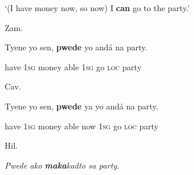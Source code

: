 \setcounter{listWWNumiileveli}{0}
\begin{listWWNumiileveli}
\item 
\begin{stylelsLanginfo}
\label{bkm:Ref52815116}‘(I have money now, so now) I \textbf{can} go to the party.’
\end{stylelsLanginfo}


\setcounter{listWWNumiilevelii}{0}
\begin{listWWNumiilevelii}
\item 
\begin{stylelsLanginfo}
Zam.
\end{stylelsLanginfo}
\end{listWWNumiilevelii}
\end{listWWNumiileveli}
\begin{stylelsSourceline}
Tyene yo sen, \textbf{pwede} yo and\'{a} na party.
\end{stylelsSourceline}

\begin{stylelsIMT}
have \textsc{1sg }money able \textsc{1sg }go \textsc{loc }party
\end{stylelsIMT}

\begin{listWWNumiileveli}
\item 
\begin{listWWNumiilevelii}
\item 
\begin{stylelsLanginfo}
Cav.
\end{stylelsLanginfo}
\end{listWWNumiilevelii}
\end{listWWNumiileveli}
\begin{stylelsSourceline}
Tyene yo sen, \textbf{pwede }ya yo and\'{a} na party.
\end{stylelsSourceline}

\begin{stylelsIMT}
have \textsc{1sg }money able now \textsc{1sg }go \textsc{loc }party
\end{stylelsIMT}

\begin{listWWNumiileveli}
\item 
\begin{listWWNumiilevelii}
\item 
\begin{stylelsLanginfo}
Hil.
\end{stylelsLanginfo}
\end{listWWNumiilevelii}
\end{listWWNumiileveli}
\begin{stylelsIMT}
\textit{Pwede ako }\textbf{\textit{maka}}\textit{kadto sa party.}
\end{stylelsIMT}


